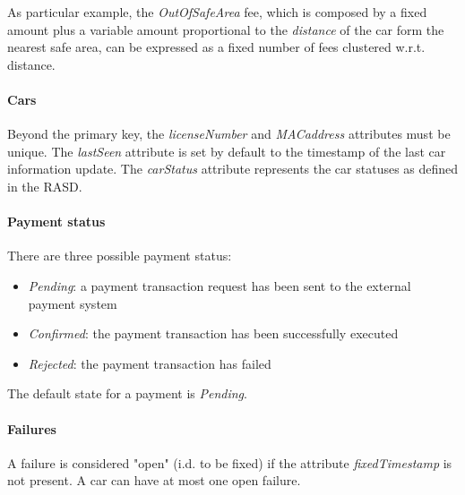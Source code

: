 As particular example, the \emph{OutOfSafeArea} fee, which is composed by a fixed amount plus a variable amount proportional to the \emph{distance} of the car form the nearest safe area, can be expressed as a fixed number of fees clustered w.r.t. distance.

\paragraph{Cars}Beyond the primary key, the \mbox{\emph{licenseNumber}} and \emph{MACaddress} attributes must be unique. The \mbox{\emph{lastSeen}} attribute is set by default to the timestamp of the last car information update. The \mbox{\emph{carStatus}} attribute represents the car statuses as defined in the RASD.

\paragraph{Payment status} There are three possible payment status:
\begin{itemize}
	\item \emph{Pending}: a payment transaction request has been sent to the external payment system
	\item \emph{Confirmed}: the payment transaction has been successfully executed
	\item \emph{Rejected}: the payment transaction has failed
\end{itemize}
The default state for a payment is \emph{Pending}.

\paragraph{Failures}A failure is considered "open" (i.d. to be fixed) if the attribute \emph{fixedTimestamp} is not present. A car can have at most one open failure.

